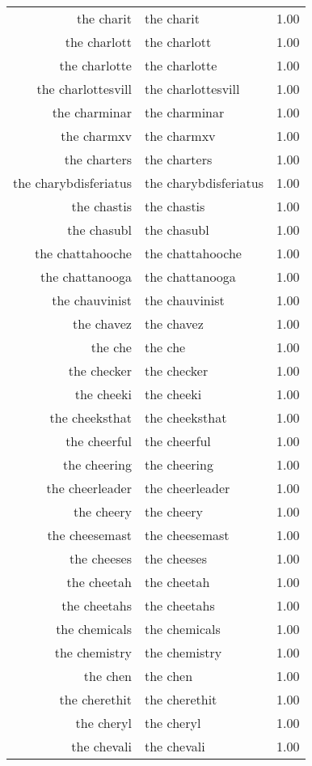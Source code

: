 \begin{table}[ht]
\begin{tabular}{rlr}
  the charit & the charit & 1.00 \\ 
  the charlott & the charlott & 1.00 \\ 
  the charlotte & the charlotte & 1.00 \\ 
  the charlottesvill & the charlottesvill & 1.00 \\ 
  the charminar & the charminar & 1.00 \\ 
  the charmxv & the charmxv & 1.00 \\ 
  the charters & the charters & 1.00 \\ 
  the charybdisferiatus & the charybdisferiatus & 1.00 \\ 
  the chastis & the chastis & 1.00 \\ 
  the chasubl & the chasubl & 1.00 \\ 
  the chattahooche & the chattahooche & 1.00 \\ 
  the chattanooga & the chattanooga & 1.00 \\ 
  the chauvinist & the chauvinist & 1.00 \\ 
  the chavez & the chavez & 1.00 \\ 
  the che & the che & 1.00 \\ 
  the checker & the checker & 1.00 \\ 
  the cheeki & the cheeki & 1.00 \\ 
  the cheeksthat & the cheeksthat & 1.00 \\ 
  the cheerful & the cheerful & 1.00 \\ 
  the cheering & the cheering & 1.00 \\ 
  the cheerleader & the cheerleader & 1.00 \\ 
  the cheery & the cheery & 1.00 \\ 
  the cheesemast & the cheesemast & 1.00 \\ 
  the cheeses & the cheeses & 1.00 \\ 
  the cheetah & the cheetah & 1.00 \\ 
  the cheetahs & the cheetahs & 1.00 \\ 
  the chemicals & the chemicals & 1.00 \\ 
  the chemistry & the chemistry & 1.00 \\ 
  the chen & the chen & 1.00 \\ 
  the cherethit & the cherethit & 1.00 \\ 
  the cheryl & the cheryl & 1.00 \\ 
  the chevali & the chevali & 1.00 \\ 

\end{tabular}
\end{table}
